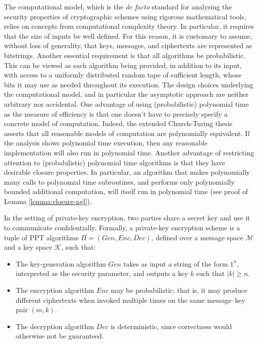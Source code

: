 The computational model, which is the \emph{de facto} standard for analysing the security properties of cryptographic schemes using rigorous mathematical tools, relies on concepts from computational complexity theory. In particular, it requires that the size of inputs be well defined. For this reason, it is customary to assume, without loss of generality, that keys, messages, and ciphertexts are represented as bitstrings. Another essential requirement is that all algorithms be probabilistic. This can be viewed as each algorithm being provided, in addition to its input, with access to a uniformly distributed random tape of sufficient length, whose bits it may use as needed throughout its execution. The design choices underlying the computational model, and in particular the asymptotic approach are neither arbitrary nor accidental. One advantage of using (probabilistic) polynomial time as the measure of efficiency is that one doesn't have to precisely specify a concrete model of computation. Indeed, the extended Church-Turing thesis asserts that all reasonable models of computation are polynomially equivalent. If the analysis shows polynomial time execution, then any reasonable implementation will also run in polynomial time. Another advantage of restricting attention to (probabilistic) polynomial time algorithms is that they have desirable closure properties. In particular, an algorithm that makes polynomially many calls to polynomial time subroutines, and performs only polynomially bounded additional computation, will itself run in polynomial time (see proof of Lemma \ref{lemma:closure-ngl}).

In the setting of private-key encryption, two parties share a secret key and use it to communicate confidentially. Formally, a private-key encryption scheme is a tuple of PPT algorithms $\Pi = (Gen, Enc, Dec)$, defined over a message space $\mathcal{M}$ and a key space $\mathcal{K}$, such that:
\begin{itemize}
\item The key-generation algorithm $Gen$ takes as input a string of the form $1^n$, interpreted as the security parameter, and outputs a key $k$ such that $|k| \geq n$.
\item The encryption algorithm $Enc$ may be probabilistic; that is, it may produce different ciphertexts when invoked multiple times on the same message--key pair $(m,k)$.
\item The decryption algorithm $Dec$ is deterministic, since correctness would otherwise not be guaranteed.
\end{itemize}

